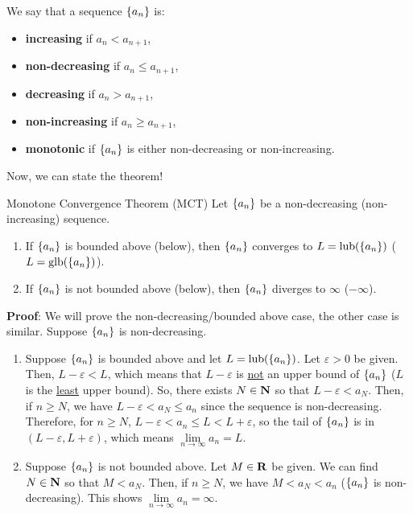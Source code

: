 \begin{Definition}{}{}
    We say that a sequence $ \{a_n\} $ is:
    \begin{itemize}
        \item \textbf{increasing} if $ a_n<a_{n+1} $,
        \item \textbf{non-decreasing} if $ a_n\le a_{n+1} $,
        \item \textbf{decreasing} if $ a_n>a_{n+1} $,
        \item \textbf{non-increasing} if $ a_n\ge a_{n+1} $,
        \item \textbf{monotonic} if $ \{a_n\} $ is either
              non-decreasing or non-increasing.
    \end{itemize}
\end{Definition}
Now, we can state the theorem!
\begin{Theorem}{Monotone Convergence Theorem (MCT)}{}
    Let $ \{a_n\} $ be a non-decreasing (non-increasing) sequence.
    \begin{enumerate}[(1)]
        \item If $ \{a_n\} $ is bounded above (below), then $ \{a_n\} $
              converges to $ L=\text{lub}(\{a_n\}) $ ($ L=\text{glb}(\{a_n\}) $).
        \item If $ \{a_n\} $ is not bounded above (below),
              then $ \{a_n\} $ diverges to $ \infty $ ($ -\infty $).
    \end{enumerate}
    \tcblower{}
    \textbf{Proof}: We will prove the non-decreasing/bounded above case,
    the other case is similar. Suppose $ \{a_n\} $ is non-decreasing.
    \begin{enumerate}[(1)]
        \item Suppose $ \{a_n\} $ is bounded above and let $ L=\text{lub}(\{a_n\}) $.
              Let $ \varepsilon>0 $ be given. Then, $ L-\varepsilon<L $,
              which means that $ L-\varepsilon $ is \underline{not}
              an upper bound of $ \{a_n\} $ ($ L $ is the \underline{least}
              upper bound). So, there exists $ N\in\mathbf{N} $ so that $ L-\varepsilon<a_N $.
              Then, if $ n\ge N $, we have $ L-\varepsilon<a_N\le a_n $
              since the sequence is non-decreasing. Therefore,
              for $ n\ge N $, $ L-\varepsilon<a_n\le L<L+\varepsilon $,
              so the tail of $ \{a_n\} $ is in $ (L-\varepsilon,L+\varepsilon) $,
              which means $ \lim\limits_{{n} \to {\infty}}a_n=L $.
        \item Suppose $ \{a_n\} $ is not bounded above. Let $ M\in\mathbf{R} $
              be given. We can find $ N\in\mathbf{N} $ so that $ M<a_N $. Then, if
              $ n\ge N $, we have $ M<a_N<a_n $ ($ \{a_n\} $ is non-decreasing).
              This shows $ \lim\limits_{{n} \to {\infty}}a_n=\infty $.
    \end{enumerate}
\end{Theorem}
